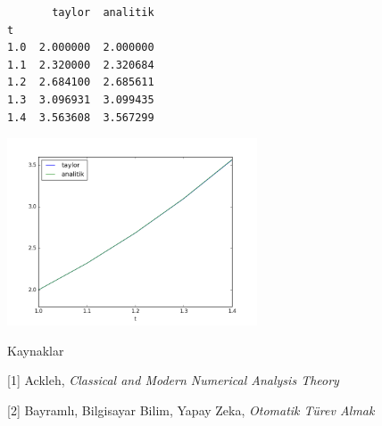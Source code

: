 \documentclass[12pt,fleqn]{article}\usepackage{../../common}
\begin{document}
\begin{verbatim}
       taylor  analitik
t                      
1.0  2.000000  2.000000
1.1  2.320000  2.320684
1.2  2.684100  2.685611
1.3  3.096931  3.099435
1.4  3.563608  3.567299
\end{verbatim}


\includegraphics[width=20em]{2_7.png}


Kaynaklar 

[1] Ackleh, {\em Classical and Modern Numerical Analysis Theory}

[2] Bayramlı, Bilgisayar Bilim, Yapay Zeka, {\em Otomatik Türev Almak}
\end{document}
